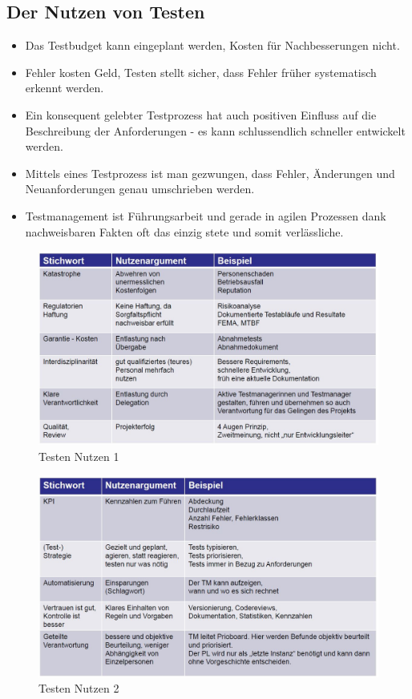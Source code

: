 \subsection{Der Nutzen von Testen}

\begin{itemize}
	\item Das Testbudget kann eingeplant werden, Kosten für Nachbesserungen nicht.
	\item Fehler kosten Geld, Testen stellt sicher, dass Fehler früher systematisch erkennt werden.
	\item Ein konsequent gelebter Testprozess hat auch positiven Einfluss auf die Beschreibung der Anforderungen - es kann schlussendlich schneller entwickelt werden.
	\item Mittels eines Testprozess ist man gezwungen, dass Fehler, Änderungen und Neuanforderungen genau umschrieben werden.
	\item Testmanagement ist Führungsarbeit und gerade in agilen Prozessen dank nachweisbaren Fakten oft das einzig stete und somit verlässliche.
\end{itemize}

\begin{figure}[h!]
	\centering
	\includegraphics[width=0.7\linewidth]{fig/testen-nutzen-1}
	\caption{Testen Nutzen 1}
	\label{fig:testen-nutzen-1}
\end{figure}

\begin{figure}[h!]
	\centering
	\includegraphics[width=0.7\linewidth]{fig/testen-nutzen-2}
	\caption{Testen Nutzen 2}
	\label{fig:testen-nutzen-2}
\end{figure}


